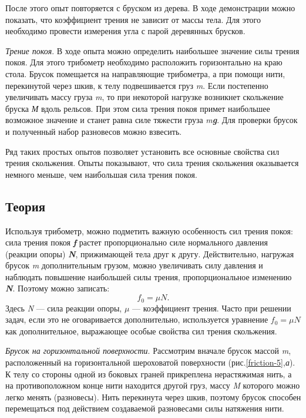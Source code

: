 \documentclass[All.tex]{subfiles}
\begin{document}
	После этого опыт повторяется с бруском из дерева.
	В ходе демонстрации можно показать, что коэффициент трения не зависит от массы тела.
	Для этого необходимо провести измерения угла с парой деревянных брусков.
	
	\textit{Трение покоя}.	
    В ходе опыта можно определить наибольшее значение силы трения покоя.
    Для этого трибометр необходимо расположить горизонтально на краю стола.
    Брусок помещается на направляющие трибометра, а при помощи нити, перекинутой через шкив, к телу подвешивается груз \textit{m}.
	Если постепенно увеличивать массу груза \textit{m}, то при некоторой нагрузке возникнет скольжение бруска \textit{М} вдоль рельсов. 
	При этом сила трения покоя примет наибольшее возможное значение и станет равна 
	силе тяжести груза \textit{m\textbf{g}}.
	Для проверки брусок и полученный набор разновесов можно взвесить.
	
	Ряд таких простых опытов позволяет установить все основные 
	свойства сил трения скольжения. 
	Опыты показывают, что сила трения скольжения оказывается немного меньше, чем наибольшая 
	сила трения покоя. 

	\subsection*{\textcolor{PineGreen}{Теория}}
	
	Используя трибометр, можно подметить важную особенность сил трения покоя: сила трения покоя \textit{\textbf{f}} растет пропорционально силе нормального давления (реакции опоры)
	\textit{\textbf{N}}, прижимающей тела друг к другу. 
	Действительно, нагружая брусок \textit{m} дополнительным грузом, можно увеличивать 
	силу давления и наблюдать повышение наибольшей силы трения, пропорциональное изменению \textit{\textbf{N}}. 
	Поэтому можно записать: 
	\begin{equation}\label{friction-4eq1}
	f_0  = \mu N.
	\end{equation}
	Здесь \textit{N} — сила реакции опоры, $ \mu $ — коэффициент трения.
	Часто при решении задач, если это не оговаривается дополнительно, используется уравнение $ f_0 = \mu N $ как дополнительное, выражающее особые свойства сил трения скольжения. 

\textit{Брусок на горизонтальной поверхности}.
Рассмотрим вначале брусок массой \textit{m}, расположенный на горизонтальной шероховатой поверхности (рис.\ref{friction-5},\textit{а}).
К телу со стороны одной из боковых граней прикреплена нерастяжимая нить, а на противоположном конце нити находится другой груз, массу \textit{M} которого можно легко менять (разновесы).
Нить перекинута через шкив, поэтому брусок способен перемещаться под действием создаваемой разновесами силы натяжения нити.
\end{document}
